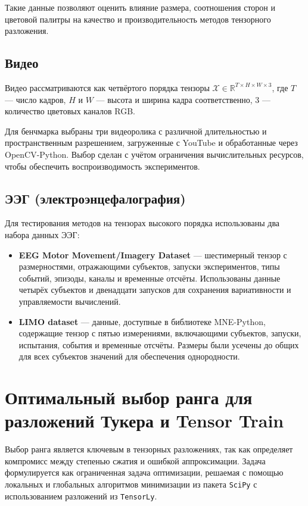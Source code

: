 Такие данные позволяют оценить влияние размера, соотношения сторон и цветовой палитры на качество и производительность методов тензорного разложения.

\subsection*{Видео}

Видео рассматриваются как четвёртого порядка тензоры \(\mathcal{X} \in \mathbb{R}^{T \times H \times W \times 3}\), где \(T\) — число кадров, \(H\) и \(W\) — высота и ширина кадра соответственно, 3 — количество цветовых каналов RGB.

Для бенчмарка выбраны три видеоролика с различной длительностью и пространственным разрешением, загруженные с YouTube и обработанные через OpenCV-Python. Выбор сделан с учётом ограничения вычислительных ресурсов, чтобы обеспечить воспроизводимость экспериментов.

\subsection*{ЭЭГ (электроэнцефалография)}

Для тестирования методов на тензорах высокого порядка использованы два набора данных ЭЭГ:

\begin{itemize}
    \item \textbf{EEG Motor Movement/Imagery Dataset} \cite{Schalk2004BCI2000} — шестимерный тензор с размерностями, отражающими субъектов, запуски экспериментов, типы событий, эпизоды, каналы и временные отсчёты. Использованы данные четырёх субъектов и двенадцати запусков для сохранения вариативности и управляемости вычислений.
    \item \textbf{LIMO dataset} — данные, доступные в библиотеке MNE-Python, содержащие тензор с пятью измерениями, включающими субъектов, запуски, испытания, события и временные отсчёты. Размеры были усечены до общих для всех субъектов значений для обеспечения однородности.
\end{itemize}

\section{Оптимальный выбор ранга для разложений Тукера и Tensor Train}
\label{sec:rank_selection_methodology}

Выбор ранга является ключевым в тензорных разложениях, так как определяет компромисс между степенью сжатия и ошибкой аппроксимации. Задача формулируется как ограниченная задача оптимизации, решаемая с помощью локальных и глобальных алгоритмов минимизации из пакета \texttt{SciPy} с использованием разложений из \texttt{TensorLy}.


